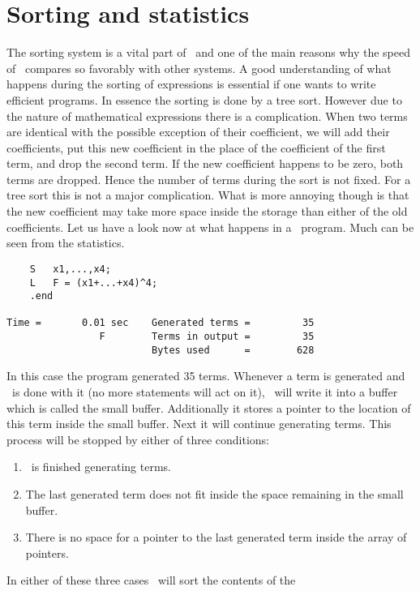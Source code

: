 
\chapter{Sorting and statistics}
\label{sorting}

The sorting system is a vital part of \FORM\ and one of the main reasons why 
the speed of \FORM\ compares so favorably with other systems. 
A good understanding of what happens during the sorting of 
expressions is essential if one wants to write efficient 
programs. In essence the sorting is done by a tree sort. 
However due to the nature of mathematical expressions there is a 
complication. When two terms are identical with the possible exception of 
their coefficient, we will add their coefficients, put this new coefficient 
in the place of the coefficient of the first term, and drop the second 
term. If the new coefficient happens to be zero, both terms are dropped. 
Hence the number of terms during the sort is not fixed. For a tree sort 
this is not a major complication. What is more annoying 
though is that the new coefficient may take more space inside the storage 
than either of the old coefficients. Let us have a look now at what happens 
in a \FORM\ program. Much can be seen from the statistics.
\begin{verbatim}
    S	x1,...,x4;
    L	F = (x1+...+x4)^4;
    .end

Time =       0.01 sec    Generated terms =         35
                F        Terms in output =         35
                         Bytes used      =        628
\end{verbatim}
In this case the program generated 35 terms. Whenever a term is generated 
and \FORM\ is done with it (no more statements will act on it), \FORM\ 
will write it into a buffer which is called the small buffer. Additionally 
it stores a pointer to the location of this term inside the small buffer. 
Next it will continue generating terms. This process will be stopped by 
either of three conditions:
\begin{enumerate}
\item \FORM\ is finished generating terms.
\item The last generated term does not fit inside the space remaining in 
the small buffer.
\item There is no space for a pointer to the last generated term inside the 
array of pointers.
\end{enumerate}
In either of these three cases \FORM\ will sort the contents of the 
